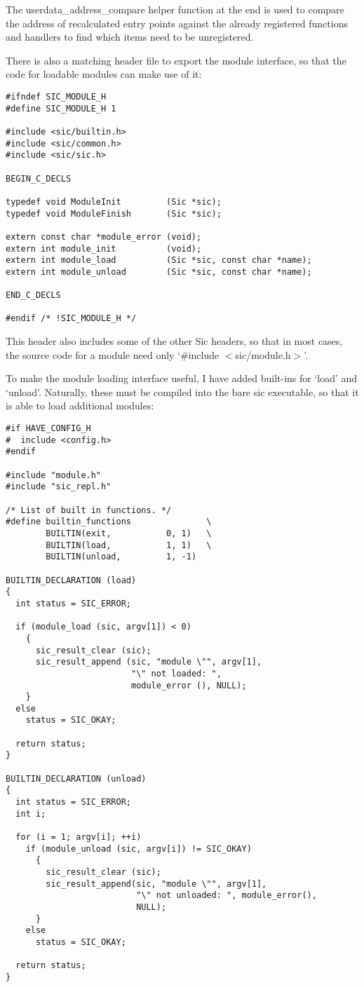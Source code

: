 The userdata\_{}address\_{}compare helper function at the end is used to compare the address of recalculated entry points against the already registered functions and handlers to find which items need to be unregistered.

There is also a matching header file to export the module interface, so that the code for loadable modules can make use of it:

 	
\begin{Verbatim}[frame=single]
#ifndef SIC_MODULE_H
#define SIC_MODULE_H 1

#include <sic/builtin.h>
#include <sic/common.h>
#include <sic/sic.h>

BEGIN_C_DECLS

typedef void ModuleInit         (Sic *sic);
typedef void ModuleFinish       (Sic *sic);

extern const char *module_error (void);
extern int module_init          (void);
extern int module_load          (Sic *sic, const char *name);
extern int module_unload        (Sic *sic, const char *name);

END_C_DECLS

#endif /* !SIC_MODULE_H */
\end{Verbatim}
 	
This header also includes some of the other Sic headers, so that in most cases,
the source code for a module need only `\#include $<$sic/module.h$>$'.

To make the module loading interface useful, I have added built-ins for `load' and `unload'. Naturally, these must be compiled into the bare sic executable, so that it is able to load additional modules:

 	
\begin{Verbatim}[frame=single]
#if HAVE_CONFIG_H
#  include <config.h>
#endif

#include "module.h"
#include "sic_repl.h"

/* List of built in functions. */
#define builtin_functions               \
        BUILTIN(exit,           0, 1)   \
        BUILTIN(load,           1, 1)   \
        BUILTIN(unload,         1, -1)

BUILTIN_DECLARATION (load)
{
  int status = SIC_ERROR;

  if (module_load (sic, argv[1]) < 0)
    {
      sic_result_clear (sic);
      sic_result_append (sic, "module \"", argv[1],
                         "\" not loaded: ",
                         module_error (), NULL);
    }
  else
    status = SIC_OKAY;

  return status;
}

BUILTIN_DECLARATION (unload)
{
  int status = SIC_ERROR;
  int i;

  for (i = 1; argv[i]; ++i)
    if (module_unload (sic, argv[i]) != SIC_OKAY)
      {
        sic_result_clear (sic);
        sic_result_append(sic, "module \"", argv[1],
                          "\" not unloaded: ", module_error(),
                          NULL);
      }
    else
      status = SIC_OKAY;

  return status;
}
\end{Verbatim}

